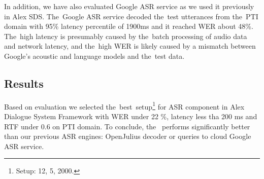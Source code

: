 In addition, we have also evaluated Google ASR service as we used it previously in Alex \ac{SDS}.
The~Google ASR service decoded the~test utterances from the~PTI domain with 95\% latency percentile of 1900ms and it reached WER about 48\%.
The~high latency is presumably caused by the~batch processing of audio data and network latency, and the~high WER is likely caused by a mismatch between Google's acoustic and language models and the~test data.

\subsection*{Results}
\label{sec:results}
Based on evaluation we selected the~best~setup\footnote{Setup:  12,  5,  2000.} for ASR component in Alex Dialogue System Framework with  WER under 22 \%, latency less tha 200 ms and RTF under 0.6 on \ac{PTI} domain.
To conclude, the~ performs significantly better than our previous \ac{ASR} engines: OpenJulius decoder or queries to cloud Google ASR service.

